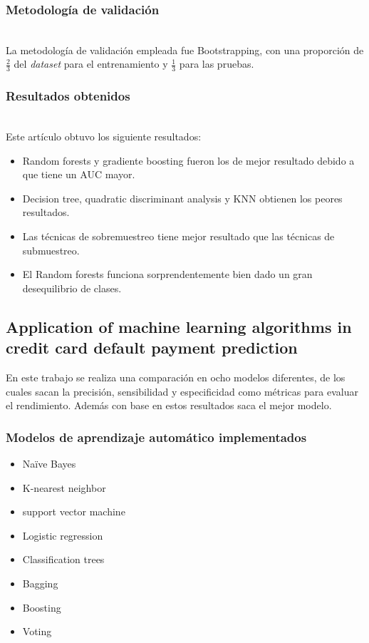 \documentclass[conference]{IEEEtran}
\begin{document}
\subsubsection{Metodología de validación}\hfill\\
La metodología de validación empleada fue Bootstrapping, con una proporción de 
$\frac{2}{3}$ del \textit{dataset} para el entrenamiento y $\frac{1}{3}$ para las pruebas.
\subsubsection{Resultados obtenidos} \hfill\\
Este artículo obtuvo los siguiente resultados:
\begin{itemize}
\item Random forests y gradiente boosting fueron los de mejor resultado debido a que tiene un AUC mayor.
\item Decision tree,  quadratic discriminant analysis y KNN obtienen los peores resultados.
\item Las técnicas de sobremuestreo tiene mejor resultado que las técnicas de submuestreo.
\item El Random forests funciona sorprendentemente bien dado un gran desequilibrio de clases.
\end{itemize}
\subsection{Application of machine learning algorithms in credit card default payment prediction}

En este trabajo se realiza una comparación en ocho modelos diferentes, de los cuales sacan la precisión, sensibilidad y especificidad como métricas para evaluar el rendimiento. Además con base en estos resultados saca el mejor modelo. \\

\subsubsection{Modelos de aprendizaje automático implementados}
\begin{itemize}
\item Naïve Bayes
\item K-nearest neighbor
\item support vector machine
\item Logistic regression
\item Classification trees
\item Bagging
\item Boosting
\item Voting
\end{itemize}
\hfill
\end{document}

